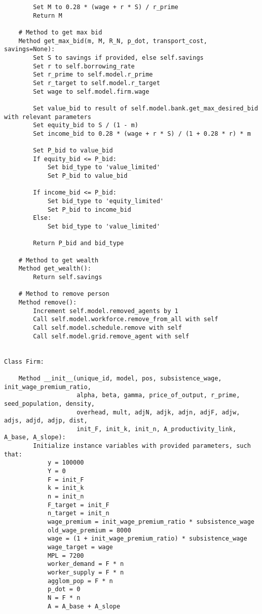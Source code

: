 {\begin{verbatim}
        Set M to 0.28 * (wage + r * S) / r_prime
        Return M

    # Method to get max bid
    Method get_max_bid(m, M, R_N, p_dot, transport_cost, savings=None):
        Set S to savings if provided, else self.savings
        Set r to self.borrowing_rate
        Set r_prime to self.model.r_prime
        Set r_target to self.model.r_target
        Set wage to self.model.firm.wage

        Set value_bid to result of self.model.bank.get_max_desired_bid with relevant parameters
        Set equity_bid to S / (1 - m)
        Set income_bid to 0.28 * (wage + r * S) / (1 + 0.28 * r) * m

        Set P_bid to value_bid
        If equity_bid <= P_bid:
            Set bid_type to 'value_limited'
            Set P_bid to value_bid

        If income_bid <= P_bid:
            Set bid_type to 'equity_limited'
            Set P_bid to income_bid
        Else:
            Set bid_type to 'value_limited'

        Return P_bid and bid_type

    # Method to get wealth
    Method get_wealth():
        Return self.savings

    # Method to remove person
    Method remove():
        Increment self.model.removed_agents by 1
        Call self.model.workforce.remove_from_all with self
        Call self.model.schedule.remove with self
        Call self.model.grid.remove_agent with self


Class Firm:

    Method __init__(unique_id, model, pos, subsistence_wage, init_wage_premium_ratio, 
                    alpha, beta, gamma, price_of_output, r_prime, seed_population, density, 
                    overhead, mult, adjN, adjk, adjn, adjF, adjw, adjs, adjd, adjp, dist, 
                    init_F, init_k, init_n, A_productivity_link, A_base, A_slope):
        Initialize instance variables with provided parameters, such that:
            y = 100000
            Y = 0
            F = init_F
            k = init_k
            n = init_n
            F_target = init_F
            n_target = init_n
            wage_premium = init_wage_premium_ratio * subsistence_wage
            old_wage_premium = 8000
            wage = (1 + init_wage_premium_ratio) * subsistence_wage
            wage_target = wage
            MPL = 7200
            worker_demand = F * n
            worker_supply = F * n
            agglom_pop = F * n
            p_dot = 0
            N = F * n
            A = A_base + A_slope


\end{verbatim}}
